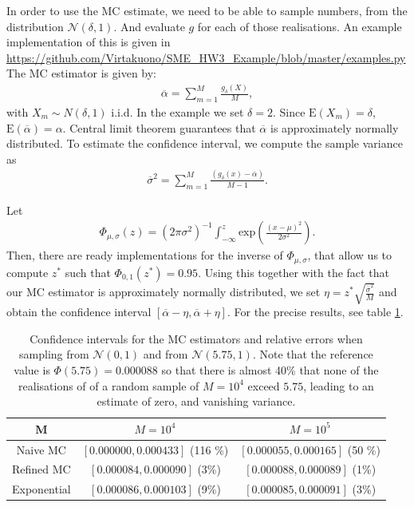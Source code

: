 \documentclass[a4paper,11pt]{article}
\newcommand{\expf}[1]{\mathrm{exp}\left ( {#1}\right )}
\newcommand{\parent}[1]{\left( {#1} \right)}
\newcommand{\ssum}[2]{\displaystyle\sum\limits_{#1}^{#2}}
\newcommand{\expp}[1]{\mathrm{E} \parent{{#1}}}
\begin{document}
In order to use the MC estimate, we need to be able to sample numbers, from
the distribution $\mathcal N \parent{\delta,1}$. And evaluate $g$ for each of those realisations.
An example implementation of this is given in \url{https://github.com/Virtakuono/SME_HW3_Example/blob/master/examples.py}
The MC estimator is given by:
\begin{align}
\overline \alpha = \ssum{m =1}{M} \frac{g_\delta \parent{X}}{M},
\end{align}
with $X_m \sim  N \parent{\delta,1}$ i.i.d. In the example we set $\delta=2$.
Since $\expp{X_m} = \delta$, $\expp{\overline \alpha} = \alpha$. Central
limit theorem guarantees that $\overline \alpha$ is approximately normally
distributed. To estimate the confidence interval, we compute the sample variance
as
\begin{align}
\overline \sigma^2 = \ssum{m=1}{M} \frac{\parent{g_\delta \parent{x}- \overline \alpha}}{M-1}.
\end{align}

Let
\begin{align}
\Phi_{\mu,\sigma} \parent{z} = \parent{ 2 \pi \sigma^2}^{-1}  \int_{-\infty}^z \expf{\frac{\parent{x-\mu}^2}{2 \sigma^2}}.
\end{align}
Then, there are ready implementations for the inverse of $\Phi_{\mu,\sigma}$, that
allow us to compute $z^*$ such that $\Phi_{0,1} \parent{z^*} = 0.95$. Using this
together with the fact that our MC estimator is approximately normally distributed,
we set $\eta = z^* \sqrt{\frac{\overline \sigma^2}{M}}$ and obtain the confidence interval
$[\overline \alpha - \eta, \overline \alpha + \eta]$. For the precise results, see table
\ref{tb:impsamp}.

\begin{table}
\begin{center}
\begin{tabular}{c c c}
M & $M=10^4$ & $M=10^5$ \\
\hline
Naive MC & $[0.000000,0.000433]$ (116 \%) &$[0.000055,0.000165]$ (50 \%) \\
Refined MC &$ [0.000084,0.000090]$ (3\%) &$ [0.000088,0.000089]$ (1\%) \\
Exponential & $[0.000086,0.000103]$ (9\%) & $ [0.000085,0.000091]$ (3\%)
\end{tabular}
\end{center}
\caption{\label{tb:impsamp}
Confidence intervals for the MC estimators and relative
errors when sampling from $\mathcal N \parent{0,1}$
and from $\mathcal N \parent{5.75,1}$.
Note that the reference value is $\Phi \parent{5.75} =0.000088$
so that there is almost 40\% that none of the realisations of of a
random sample of $M=10^4$ exceed $5.75$, leading to an estimate
of zero, and vanishing variance.
}
\end{table}
\end{document}
